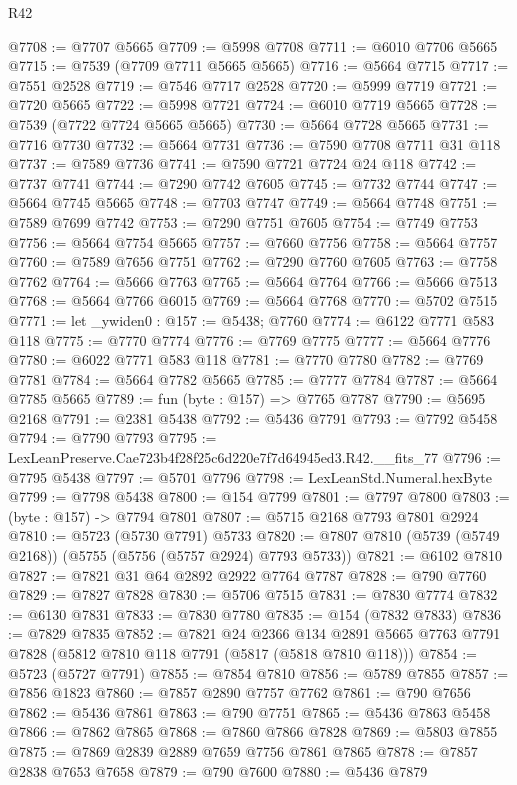 \begin{lexlean}{R42}
\begin{coremodule}
@7708 := @7707 @5665
@7709 := @5998 @7708
@7711 := @6010 @7706 @5665
@7715 := @7539 (@7709 @7711 @5665 @5665)
@7716 := @5664 @7715
@7717 := @7551 @2528
@7719 := @7546 @7717 @2528
@7720 := @5999 @7719
@7721 := @7720 @5665
@7722 := @5998 @7721
@7724 := @6010 @7719 @5665
@7728 := @7539 (@7722 @7724 @5665 @5665)
@7730 := @5664 @7728 @5665
@7731 := @7716 @7730
@7732 := @5664 @7731
@7736 := @7590 @7708 @7711 @31 @118
@7737 := @7589 @7736
@7741 := @7590 @7721 @7724 @24 @118
@7742 := @7737 @7741
@7744 := @7290 @7742 @7605
@7745 := @7732 @7744
@7747 := @5664 @7745 @5665
@7748 := @7703 @7747
@7749 := @5664 @7748
@7751 := @7589 @7699 @7742
@7753 := @7290 @7751 @7605
@7754 := @7749 @7753
@7756 := @5664 @7754 @5665
@7757 := @7660 @7756
@7758 := @5664 @7757
@7760 := @7589 @7656 @7751
@7762 := @7290 @7760 @7605
@7763 := @7758 @7762
@7764 := @5666 @7763
@7765 := @5664 @7764
@7766 := @5666 @7513
@7768 := @5664 @7766 @6015
@7769 := @5664 @7768
@7770 := @5702 @7515
@7771 := let _ywiden0 : @157 := @5438; @7760
@7774 := @6122 @7771 @583 @118
@7775 := @7770 @7774
@7776 := @7769 @7775
@7777 := @5664 @7776
@7780 := @6022 @7771 @583 @118
@7781 := @7770 @7780
@7782 := @7769 @7781
@7784 := @5664 @7782 @5665
@7785 := @7777 @7784
@7787 := @5664 @7785 @5665
@7789 := fun (byte : @157) => @7765 @7787
@7790 := @5695 @2168
@7791 := @2381 @5438
@7792 := @5436 @7791
@7793 := @7792 @5458
@7794 := @7790 @7793
@7795 := LexLeanPreserve.Cae723b4f28f25c6d220e7f7d64945ed3.R42.__fits_77
@7796 := @7795 @5438
@7797 := @5701 @7796
@7798 := LexLeanStd.Numeral.hexByte
@7799 := @7798 @5438
@7800 := @154 @7799
@7801 := @7797 @7800
@7803 := (byte : @157) -> @7794 @7801
@7807 := @5715 @2168 @7793 @7801 @2924
@7810 := @5723 (@5730 @7791) @5733
@7820 := @7807 @7810 (@5739 (@5749 @2168)) (@5755 (@5756 (@5757 @2924) @7793 @5733))
@7821 := @6102 @7810
@7827 := @7821 @31 @64 @2892 @2922 @7764 @7787
@7828 := @790 @7760
@7829 := @7827 @7828
@7830 := @5706 @7515
@7831 := @7830 @7774
@7832 := @6130 @7831
@7833 := @7830 @7780
@7835 := @154 (@7832 @7833)
@7836 := @7829 @7835
@7852 := @7821
    @24
    @2366
    @134
    @2891
    @5665
    @7763
    @7791
    @7828
    (@5812 @7810 @118 @7791 (@5817 (@5818 @7810 @118)))
@7854 := @5723 (@5727 @7791)
@7855 := @7854 @7810
@7856 := @5789 @7855
@7857 := @7856 @1823
@7860 := @7857 @2890 @7757 @7762
@7861 := @790 @7656
@7862 := @5436 @7861
@7863 := @790 @7751
@7865 := @5436 @7863 @5458
@7866 := @7862 @7865
@7868 := @7860 @7866 @7828
@7869 := @5803 @7855
@7875 := @7869 @2839 @2889 @7659 @7756 @7861 @7865
@7878 := @7857 @2838 @7653 @7658
@7879 := @790 @7600
@7880 := @5436 @7879

\end{coremodule}
\end{lexlean}
